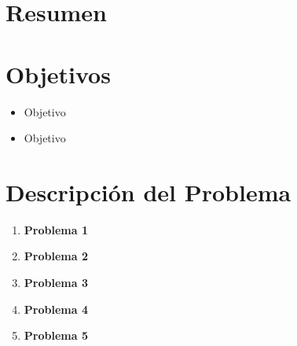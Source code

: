 \documentclass[letterpaper, titlepage]{article}
\begin{document}
\maketitle
\newpage
\section{Resumen}
\section{Objetivos}
	\begin{itemize}
		\item Objetivo
		\item Objetivo
	\end{itemize}
\newpage

\section{Descripción del Problema}
	\begin{enumerate}
		\item \textbf{Problema 1}
		
		\item \textbf{Problema 2}
		
		\item \textbf{Problema 3}
		
		\item \textbf{Problema 4}
		
		\item \textbf{Problema 5}
	\end{enumerate}
\newpage
\end{document}

